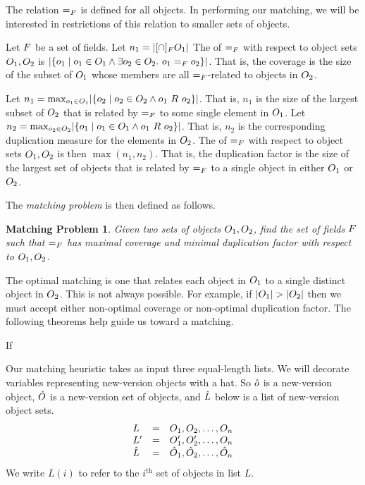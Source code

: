The relation $=_{F}$ is defined for all objects.  In performing our matching, we will be interested in restrictions of this relation to smaller sets of objects.
\begin{defn}
Let $F$ be a set of fields.
Let $n_1 = \lvert [\cap]_{F} O_1 \rvert$
The  of $=_{F}$ with respect to object sets $O_1, O_2$ is $\setsize{\{o_1 \mid o_1 \in \objset_1 \wedge \E[o_2 \in \objset_2] o_1 \eqf{\fset} o_2\}}$.  That is, the coverage is the size of the subset of $O_1$ whose members are all $=_{F}$-related to objects in $O_2$.
\end{defn}
\begin{defn}
Let $n_1 = \max_{o_1 \in \objset_1}\setsize{\{o_2 \mid o_2 \in \objset_2 \wedge o_1\ R\ o_2\}}$.  That is, $n_1$ is the size of the largest subset of $O_2$ that is related by $=_{F}$ to some single element in $O_1$.  Let $n_2 = \max_{o_2 \in O_2}\lvert \{o_1 \mid o_1 \in O_1 \wedge o_1\ R\ o_2\} \rvert$.  That is, $n_2$ is the corresponding duplication measure for the elements in $O_2$.
The  of $=_{F}$ with respect to object sets $O_1, O_2$ is then $\max(n_1,n_2)$.  That is, the duplication factor is the size of the largest set of objects that is related by $=_{F}$ to a single object in either $O_1$ or $O_2$.
\end{defn}

The \emph{matching problem} is then defined as follows.
\newtheorem*{mprob}{Matching Problem}
\begin{mprob}
Given two sets of objects $O_1, O_2$, find the set of fields $F$ such that $=_{F}$ has maximal coverage and minimal duplication factor with respect to $O_1, O_2$.
\end{mprob}

The optimal matching is one that relates each object in $O_1$ to a single distinct object in $O_2$.  This is not always possible.  For example, if $\lvert O_1 \rvert > \lvert O_2 \rvert$ then we must accept either non-optimal coverage or non-optimal duplication factor.
The following theorems help guide us toward a matching.

\begin{thm}
If 
\end{thm}

Our matching heuristic takes as input three equal-length lists.  We will decorate variables representing new-version objects with a hat.  So $\hat{o}$ is a new-version object, $\hat{O}$ is a new-version set of objects, and $\hat{L}$ below is a list of new-version object sets.
\[
\begin{array}{lcl}
L &=& O_1, O_2, \ldots, O_n \\
L' &=& O_1', O_2', \ldots, O_n \\
\hat{L} &=& \hat{O}_1, \hat{O}_2, \ldots, \hat{O}_n
\end{array}
\]
We write $L(i)$ to refer to the $i^{\text{th}}$ set of objects in list $L$.

